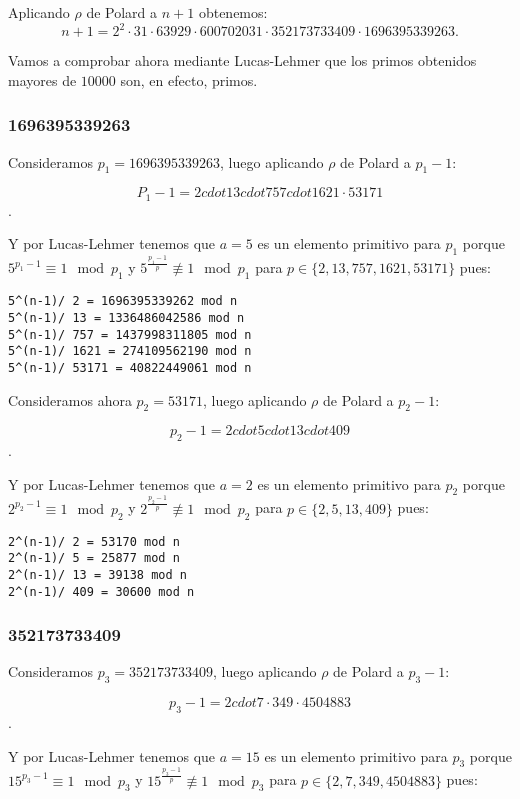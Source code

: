 \documentclass[a4paper]{article}
\begin{document}
Aplicando $\rho$ de Polard a $n+1$ obtenemos:
$$n+1 = 2^2\cdot 31 \cdot 63929\cdot 600702031\cdot 352173733409\cdot 1696395339263.$$

Vamos a comprobar ahora mediante Lucas-Lehmer que los primos obtenidos mayores de $10000$ son, en efecto, primos.

\subsubsection{1696395339263}
Consideramos $p_1=1696395339263$, luego aplicando $\rho$ de Polard a $p_1-1$:

$$P_1-1=2 cdot 13 cdot 757 cdot 1621 \cdot 53171$$.

Y por Lucas-Lehmer tenemos que $a=5$ es un elemento primitivo para $p_1$ porque $5^{p_1-1}\equiv 1\mod p_1$ y $5^{\frac{p_1-1}{p}}\not\equiv 1\mod p_1 $ para $p\in\{2, 13, 757, 1621, 53171\}$ pues:

\begin{verbatim}
5^(n-1)/ 2 = 1696395339262 mod n
5^(n-1)/ 13 = 1336486042586 mod n
5^(n-1)/ 757 = 1437998311805 mod n
5^(n-1)/ 1621 = 274109562190 mod n
5^(n-1)/ 53171 = 40822449061 mod n
\end{verbatim}

Consideramos ahora $p_2=53171$, luego aplicando $\rho$ de Polard a $p_2-1$:

$$p_2-1=2 cdot 5 cdot 13 cdot 409$$.

Y por Lucas-Lehmer tenemos que $a=2$ es un elemento primitivo para $p_2$ porque $2^{p_2-1}\equiv 1\mod p_2$ y $2^{\frac{p_2-1}{p}}\not\equiv 1\mod p_2 $ para $p\in\{2, 5, 13, 409\}$ pues:

\begin{verbatim}
2^(n-1)/ 2 = 53170 mod n
2^(n-1)/ 5 = 25877 mod n
2^(n-1)/ 13 = 39138 mod n
2^(n-1)/ 409 = 30600 mod n
\end{verbatim}

\subsubsection{352173733409}
Consideramos $p_3=352173733409$, luego aplicando $\rho$ de Polard a $p_3-1$:

$$p_3-1=2 cdot 7 \cdot 349\cdot 4504883$$.

Y por Lucas-Lehmer tenemos que $a=15$ es un elemento primitivo para $p_3$ porque $15^{p_3-1}\equiv 1\mod p_3$ y $15^{\frac{p_3-1}{p}}\not\equiv 1\mod p_3 $ para $p\in\{2, 7, 349, 4504883\}$ pues:
\end{document}
